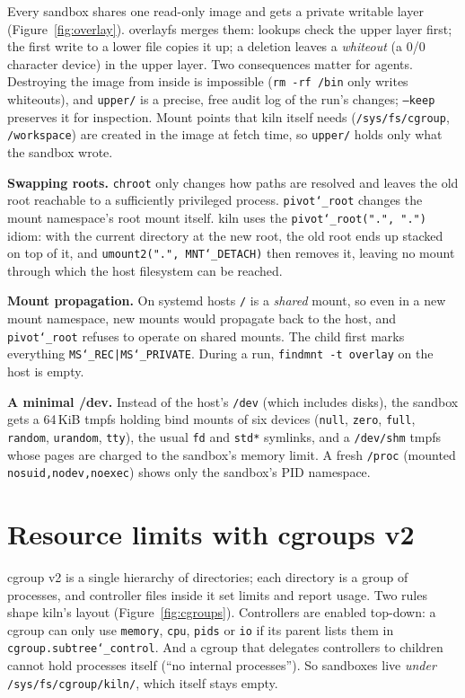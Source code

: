 \documentclass[10pt,letterpaper]{article}
\newcommand{\code}[1]{\texttt{#1}}
\newcommand{\us}{\char`\_}
\begin{document}
Every sandbox shares one read-only image and gets a private writable layer
(Figure~\ref{fig:overlay}). overlayfs merges them: lookups check the upper
layer first; the first write to a lower file copies it up; a deletion leaves a
\emph{whiteout} (a 0/0 character device) in the upper layer. Two consequences
matter for agents. Destroying the image from inside is impossible (\code{rm -rf
/bin} only writes whiteouts), and \code{upper/} is a precise, free audit log of
the run's changes; \code{--keep} preserves it for inspection. Mount points that
kiln itself needs (\code{/sys/fs/cgroup}, \code{/workspace}) are created in the
image at fetch time, so \code{upper/} holds only what the sandbox wrote.

\textbf{Swapping roots.} \code{chroot} only changes how paths are resolved and
leaves the old root reachable to a sufficiently privileged process.
\code{pivot\us{}root} changes the mount namespace's root mount itself. kiln uses
the \code{pivot\us{}root(".", ".")} idiom: with the current directory at the new
root, the old root ends up stacked on top of it, and \code{umount2(".",
MNT\us{}DETACH)} then removes it, leaving no mount through which the host
filesystem can be reached.

\textbf{Mount propagation.} On systemd hosts \code{/} is a \emph{shared} mount, so
even in a new mount namespace, new mounts would propagate back to the host, and
\code{pivot\us{}root} refuses to operate on shared mounts. The child first marks
everything \code{MS\us{}REC|MS\us{}PRIVATE}. During a run, \code{findmnt -t
overlay} on the host is empty.

\textbf{A minimal /dev.} Instead of the host's \code{/dev} (which includes disks),
the sandbox gets a 64\,KiB tmpfs holding bind mounts of six devices (\code{null},
\code{zero}, \code{full}, \code{random}, \code{urandom}, \code{tty}), the usual
\code{fd} and \code{std*} symlinks, and a \code{/dev/shm} tmpfs whose pages are
charged to the sandbox's memory limit. A fresh \code{/proc} (mounted
\code{nosuid,nodev,noexec}) shows only the sandbox's PID namespace.

\section{Resource limits with cgroups v2}

cgroup v2 is a single hierarchy of directories; each directory is a group of
processes, and controller files inside it set limits and report usage. Two rules
shape kiln's layout (Figure~\ref{fig:cgroups}). Controllers are enabled
top-down: a cgroup can only use \code{memory}, \code{cpu}, \code{pids} or
\code{io} if its parent lists them in \code{cgroup.subtree\us{}control}. And a
cgroup that delegates controllers to children cannot hold processes itself (``no
internal processes''). So sandboxes live \emph{under} \code{/sys/fs/cgroup/kiln/},
which itself stays empty.
\end{document}
